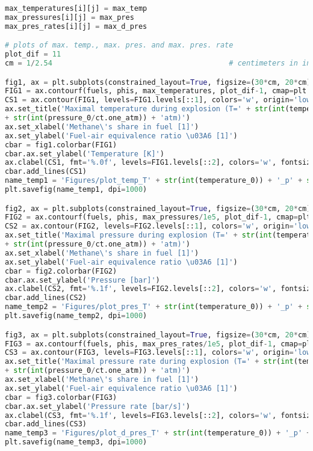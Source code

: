 \begin{lstlisting}[language=Python]
max_temperatures[i][j] = max_temp
max_pressures[i][j] = max_pres
max_pres_rates[i][j] = max_d_pres

# plots of max. temp., max. pres. and max. pres. rate
plot_dif = 11
cm = 1/2.54                                         # centimeters in inches

fig1, ax = plt.subplots(constrained_layout=True, figsize=(30*cm, 20*cm))
FIG1 = ax.contourf(fuels, phis, max_temperatures, plot_dif-1, cmap=plt.cm.bone, origin='lower')
CS1 = ax.contour(FIG1, levels=FIG1.levels[::1], colors='w', origin='lower')
ax.set_title('Maximal temperature during explosion (T=' + str(int(temperature_0)) + 'K, p='
+ str(int(pressure_0/ct.one_atm)) + 'atm)')
ax.set_xlabel('Methane\'s share in fuel [1]')
ax.set_ylabel('Fuel-air equivalence ratio \u03A6 [1]')
cbar = fig1.colorbar(FIG1)
cbar.ax.set_ylabel('Temperature [K]')
ax.clabel(CS1, fmt='%.0f', levels=FIG1.levels[::2], colors='w', fontsize=10)
cbar.add_lines(CS1)
name_temp1 = 'Figures/plot_temp_T' + str(int(temperature_0)) + '_p' + str(int(pressure_0)) + '.png'
plt.savefig(name_temp1, dpi=1000)

fig2, ax = plt.subplots(constrained_layout=True, figsize=(30*cm, 20*cm))
FIG2 = ax.contourf(fuels, phis, max_pressures/1e5, plot_dif-1, cmap=plt.cm.bone, origin='lower')
CS2 = ax.contour(FIG2, levels=FIG2.levels[::1], colors='w', origin='lower')
ax.set_title('Maximal pressure during explosion (T=' + str(int(temperature_0)) + 'K, p='
+ str(int(pressure_0/ct.one_atm)) + 'atm)')
ax.set_xlabel('Methane\'s share in fuel [1]')
ax.set_ylabel('Fuel-air equivalence ratio \u03A6 [1]')
cbar = fig2.colorbar(FIG2)
cbar.ax.set_ylabel('Pressure [bar]')
ax.clabel(CS2, fmt='%.1f', levels=FIG2.levels[::2], colors='w', fontsize=10)
cbar.add_lines(CS2)
name_temp2 = 'Figures/plot_pres_T' + str(int(temperature_0)) + '_p' + str(int(pressure_0)) + '.png'
plt.savefig(name_temp2, dpi=1000)

fig3, ax = plt.subplots(constrained_layout=True, figsize=(30*cm, 20*cm))
FIG3 = ax.contourf(fuels, phis, max_pres_rates/1e5, plot_dif-1, cmap=plt.cm.bone, origin='lower')
CS3 = ax.contour(FIG3, levels=FIG3.levels[::1], colors='w', origin='lower')
ax.set_title('Maximal pressure rate during explosion (T=' + str(int(temperature_0)) + 'K, p='
+ str(int(pressure_0/ct.one_atm)) + 'atm)')
ax.set_xlabel('Methane\'s share in fuel [1]')
ax.set_ylabel('Fuel-air equivalence ratio \u03A6 [1]')
cbar = fig3.colorbar(FIG3)
cbar.ax.set_ylabel('Pressure rate [bar/s]')
ax.clabel(CS3, fmt='%.1f', levels=FIG3.levels[::2], colors='w', fontsize=10)
cbar.add_lines(CS3)
name_temp3 = 'Figures/plot_d_pres_T' + str(int(temperature_0)) + '_p' + str(int(pressure_0)) + '.png'
plt.savefig(name_temp3, dpi=1000)


\end{lstlisting}
